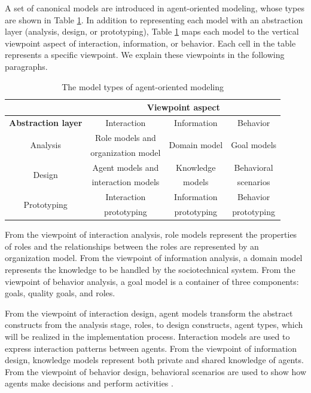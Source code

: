A set of canonical models are introduced in agent-oriented modeling, whose types are shown in Table \ref{ch3:tmodeltypes}. In addition to representing each model with an abstraction layer (analysis, design, or prototyping), Table \ref{ch3:tmodeltypes} maps each model to the vertical viewpoint aspect of interaction, information, or behavior. Each cell in the table represents a specific viewpoint. We explain these viewpoints in the following paragraphs.

\begin{table}[!t]
\caption{The model types of agent-oriented modeling}

\centering
\begin{tabular}{|c|c|c|c|} 
\hline

& \multicolumn{3}{c|}{\textbf{Viewpoint aspect}}\\ \hline
\textbf{Abstraction layer} & Interaction & Information & Behavior\\ \hline
\multirow{2}{*}{Analysis} & Role models and & \multirow{2}{*}{Domain model}& \multirow{2}{*}{Goal models}\\  
 &organization model & & \\
\hline
\multirow{2}{*}{Design} & Agent models and & Knowledge& Behavioral \\
 & interaction models&  models& scenarios\\ 
\hline
\multirow{2}{*}{Prototyping} & Interaction & Information & Behavior \\ 
 & prototyping & prototyping& prototyping\\ 
\hline
\end{tabular}
\label{ch3:tmodeltypes}
\end{table}

From the viewpoint of interaction analysis, role models represent the properties of roles and the relationships between the roles are represented by an organization model. From the viewpoint of information analysis, a domain model represents the knowledge to be handled by the sociotechnical system. From the viewpoint of behavior analysis, a goal model is a container of three components: goals, quality goals, and roles.  

From the viewpoint of interaction design, agent models transform the abstract constructs from the analysis stage, roles, to design constructs, agent types, which will be realized in the implementation process. Interaction models are used to express interaction patterns between agents. From the viewpoint of information design, knowledge models represent both private and shared knowledge of agents. From the viewpoint of behavior design, behavioral scenarios are used to show how agents make decisions and perform activities \cite{taveter2012j}.

